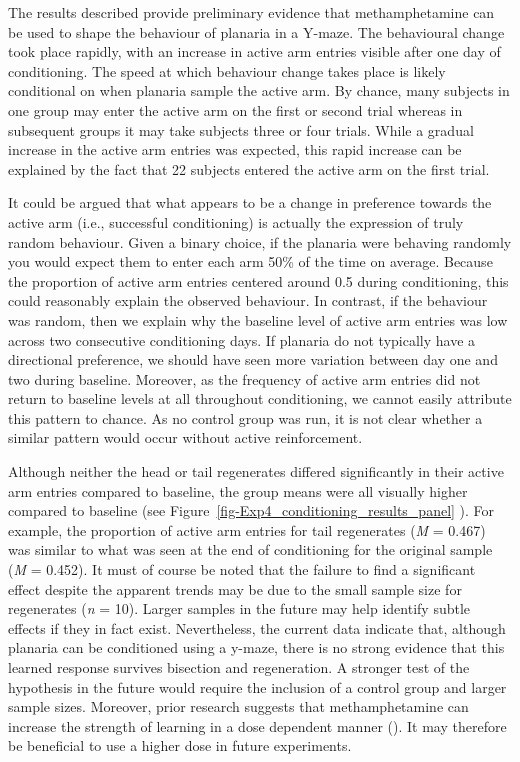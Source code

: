 \documentclass[
  jou,
  floatsintext,
  longtable,
  nolmodern,
  notxfonts,
  notimes,
  donotrepeattitle,
  colorlinks=true,linkcolor=blue,citecolor=blue,urlcolor=blue]{apa7}
\begin{document}
The results described provide preliminary evidence that methamphetamine
can be used to shape the behaviour of planaria in a Y-maze. The
behavioural change took place rapidly, with an increase in active arm
entries visible after one day of conditioning. The speed at which
behaviour change takes place is likely conditional on when planaria
sample the active arm. By chance, many subjects in one group may enter
the active arm on the first or second trial whereas in subsequent groups
it may take subjects three or four trials. While a gradual increase in
the active arm entries was expected, this rapid increase can be
explained by the fact that 22 subjects entered the active arm on the
first trial.

It could be argued that what appears to be a change in preference
towards the active arm (i.e., successful conditioning) is actually the
expression of truly random behaviour. Given a binary choice, if the
planaria were behaving randomly you would expect them to enter each arm
50\% of the time on average. Because the proportion of active arm
entries centered around 0.5 during conditioning, this could reasonably
explain the observed behaviour. In contrast, if the behaviour was
random, then we explain why the baseline level of active arm entries was
low across two consecutive conditioning days. If planaria do not
typically have a directional preference, we should have seen more
variation between day one and two during baseline. Moreover, as the
frequency of active arm entries did not return to baseline levels at all
throughout conditioning, we cannot easily attribute this pattern to
chance. As no control group was run, it is not clear whether a similar
pattern would occur without active reinforcement.

Although neither the head or tail regenerates differed significantly in
their active arm entries compared to baseline, the group means were all
visually higher compared to baseline (see
Figure~\ref{fig-Exp4_conditioning_results_panel} ). For example, the
proportion of active arm entries for tail regenerates (\emph{M} = 0.467)
was similar to what was seen at the end of conditioning for the original
sample (\emph{M} = 0.452). It must of course be noted that the failure
to find a significant effect despite the apparent trends may be due to
the small sample size for regenerates (\emph{n} = 10). Larger samples in
the future may help identify subtle effects if they in fact exist.
Nevertheless, the current data indicate that, although planaria can be
conditioned using a y-maze, there is no strong evidence that this
learned response survives bisection and regeneration. A stronger test of
the hypothesis in the future would require the inclusion of a control
group and larger sample sizes. Moreover, prior research suggests that
methamphetamine can increase the strength of learning in a dose
dependent manner (). It may therefore be beneficial to use a higher dose in
future experiments.
\end{document}
